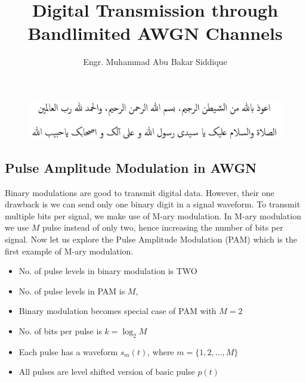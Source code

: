 \documentclass[a4paper]{article}
\title{Digital Transmission through Bandlimited AWGN Channels}
\author{Engr. Muhammad Abu Bakar Siddique}
\numberwithin{equation}{subsection}
\begin{document}
	
	\maketitle
%	
%		
	
	
	\setcounter{section}{8}
	
	\begin{figure}[h] 
		\includegraphics[width=.7\textwidth]{../figures/darood}	
		\centering
	\end{figure}

	\vspace{-1.5em}
	
	\setcounter{figure}{0}
	\subsection{Pulse Amplitude Modulation in AWGN}
	
	Binary modulations are good to transmit digital data. However, their one drawback is we can send only one binary digit in a signal waveform. To transmit multiple bits per signal, we make use of M-ary modulation. In M-ary modulation we use $M$ pulse instead of only two, hence increasing the number of bits per signal. Now let us explore the Pulse Amplitude Modulation (PAM) which is the first example of M-ary modulation.
	\
	\begin{itemize}
		\item No. of pulse levels in binary modulation is TWO
		\item No. of pulse levels in PAM is $M$, 
		\item Binary modulation becomes special case of PAM with $M=2$
		\item No. of bits per pulse is $k=\log_2 M$
		\item Each pulse has a waveform $s_m(t)$, where $m=\{1,2,\dots,M\}$
		\item All pulses are level shifted version of basic pulse $p(t)$
		
		
	\end{itemize}
	
\end{document}
